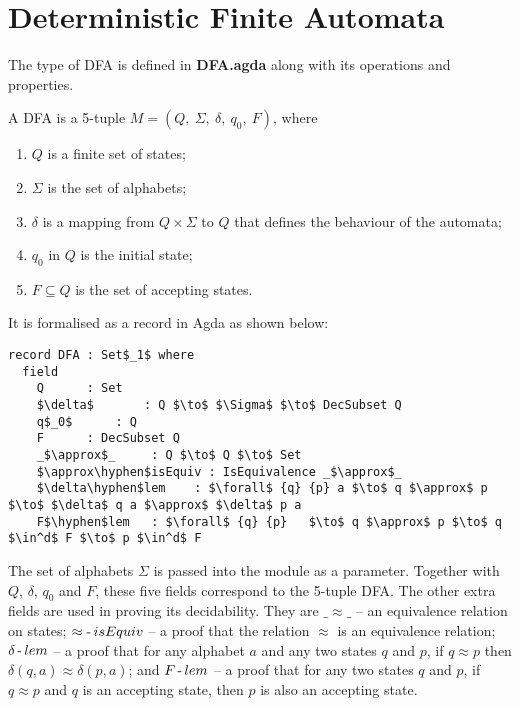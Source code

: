 \section{Deterministic Finite Automata}
\par The type of DFA is defined in \textbf{DFA.agda} along with its
operations and properties. 

\begin{defn}
\noindent A DFA is a 5-tuple \(M = (Q
,\ \Sigma,\ \delta,\ q_0,\ F)\), where
\begin{enumerate}[nolistsep]
  \item \(Q\) is a finite set of states;
  \item \(\Sigma\) is the set of alphabets;
  \item \(\delta\) is a mapping from \(Q \times \Sigma\) to \(Q\) that defines the behaviour of the automata;
  \item \(q_0\) in \(Q\) is the initial state;
  \item \(F \subseteq Q\) is the set of accepting states. 
\end{enumerate}
\end{defn}

\par It is formalised as a record in Agda as shown below: 

\begin{lstlisting}[mathescape=true,xleftmargin=.15\textwidth]
record DFA : Set$_1$ where
  field
    Q      : Set
    $\delta$       : Q $\to$ $\Sigma$ $\to$ DecSubset Q
    q$_0$      : Q
    F      : DecSubset Q
    _$\approx$_     : Q $\to$ Q $\to$ Set
    $\approx\hyphen$isEquiv : IsEquivalence _$\approx$_
    $\delta\hyphen$lem    : $\forall$ {q} {p} a $\to$ q $\approx$ p $\to$ $\delta$ q a $\approx$ $\delta$ p a
    F$\hyphen$lem   : $\forall$ {q} {p}   $\to$ q $\approx$ p $\to$ q $\in^d$ F $\to$ p $\in^d$ F
\end{lstlisting}

\par The set of alphabets \(\Sigma\) is passed into the module as a
parameter. Together with \(Q\), \(\delta\),
\(q_0\) and \(F\), these five fields correspond to the 5-tuple
DFA. The other extra fields are used in proving its decidability. They
are \(\_\approx\_\) -- an equivalence relation on states;
\(\approx\operatorname{-} isEquiv\) -- a proof that the relation \(\approx\) is
an equivalence relation; \(\delta\operatorname{-} lem\) -- a proof that for any
alphabet \(a\) and any two states \(q\) and \(p\), if \(q \approx p\)
then \(\delta (q,a) \approx \delta (p,a)\); and \(F\operatorname{-} lem\) -- a
proof that for any two states \(q\) and \(p\), if \(q \approx p\) and
\(q\) is an accepting state, then \(p\) is also an accepting state. 

